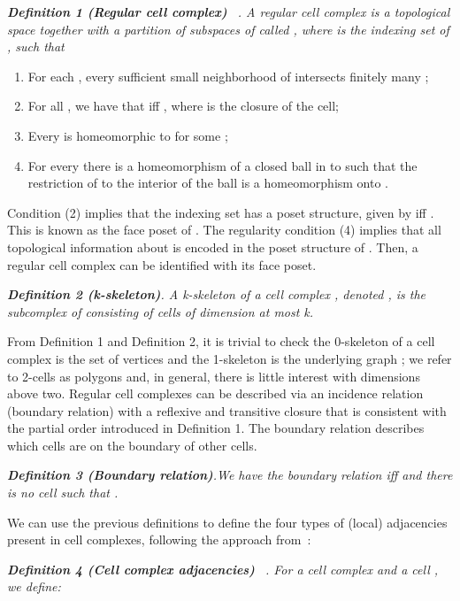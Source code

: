 \documentclass{article}
\begin{document}
\textit{\textbf{Definition 1 (Regular cell complex) }~\cite{hansen2019toward, bodnarcwnet}. A {\it regular cell complex} is a topological space  together with a partition  of subspaces  of  called , where  is the indexing set of , such that}

\begin{enumerate}
    \item For each    , every sufficient small neighborhood of  intersects finitely many ;  
    \item For all , we have that      iff   , where  is the closure of the cell;
    \item Every  is homeomorphic to  for some ;
    \item For every    there is a homeomorphism  of a closed ball in  to  such that the restriction of  to the interior of the ball is a homeomorphism onto .
\end{enumerate}


Condition (2) implies that the indexing set  has a poset structure, given by    iff   . This is known as the face poset of . The regularity condition (4) implies that all topological information about  is encoded in the poset structure of . Then, a regular cell complex can be identified with its face poset. 




\textit{\textbf{Definition 2 (k-skeleton)}. A {\it k-skeleton} of a cell complex , denoted , is the subcomplex of  consisting of cells of dimension at most k.}

From Definition 1 and Definition 2, it is trivial to check the 0-skeleton of a cell complex is the set of vertices  and the 1-skeleton is the underlying graph ; we refer to 2-cells as polygons and, in general, there is little interest with dimensions above two. Regular cell complexes can be described via an incidence relation (boundary relation) with a  reflexive and transitive closure that is consistent with the partial order introduced in Definition 1. The boundary relation describes which cells are on the boundary of other cells.


\textit{\textbf{Definition 3 (Boundary relation)}.We have the boundary relation     iff    and there is no cell  such that
     .}


We can use the previous definitions to define the four types of (local) adjacencies present in cell complexes, following the approach from~\cite{bodnarcwnet}: 

\textit{\textbf{Definition 4 (Cell complex adjacencies) }~\cite{bodnarcwnet}. For a cell complex  and a cell , we define: }
\end{document}
